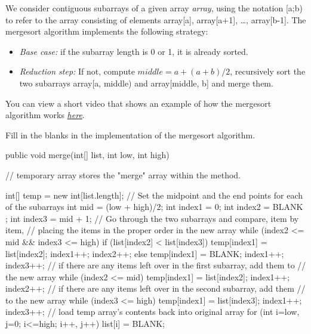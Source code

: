 We consider contiguous subarrays of a given array \textit{array}, using the notation [a;b) to refer to the array consisting of elements array[a], array[a+1], …, array[b-1]. The mergesort algorithm implements the following strategy:
   
\begin{itemize}
\item \textit{Base case:} if the subarray length is 0 or 1, it is already sorted.
\item \textit{Reduction step:} If not, compute $middle = a + (a+b)/2$, recursively sort the two subarrays array[a, middle) and array[middle, b] and merge them.
\end{itemize}

You can view a short video that shows an example of how the mergesort algorithm works \href{https://youtu.be/4VqmGXwpLqc}{\textit{here}}.




\begin{exercise}

Fill in the blanks in the implementation of the mergesort algorithm.
\begin{code}

public void merge(int[] list, int low, int high) {
// temporary array stores the "merge" array within the method.

int[] temp = new int[list.length];
    // Set the midpoint and the end points for each of the subarrays
    int mid = (low + high)/2;
    int index1 = 0;
    int index2 = BLANK ;
    int index3 = mid + 1;
    // Go through the two subarrays and compare, item by item,
    // placing the items in the proper order in the new array
    while (index2 <= mid && index3 <= high) {
        if (list[index2] < list[index3]) {
            temp[index1] = list[index2];
            index1++;
            index2++;
}
else {
            temp[index1] = BLANK;
            index1++;
            index3++;
} }
    // if there are any items left over in the first subarray, add them to
    // the new array
    while (index2 <= mid) {
        temp[index1] = list[index2];
        index1++;
        index2++;
}
    // if there are any items left over in the second subarray, add them
    // to the new array
    while (index3 <= high) {
        temp[index1] = list[index3];
        index1++;
        index3++;
}
    // load temp array's contents back into original array
    for (int i=low, j=0; i<=high; i++, j++) {
        list[i] = BLANK;
    }
}

 
\end{code}
 

\end{exercise}
 

